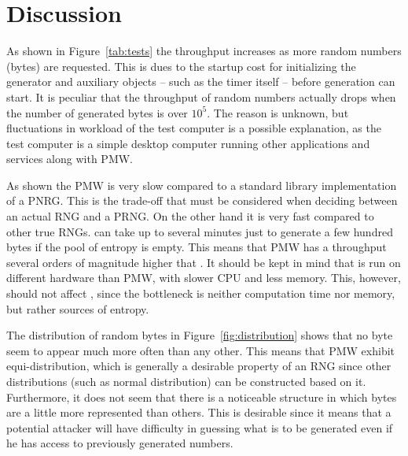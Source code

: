 \section{Discussion}
\label{sec:discussion}
As shown in Figure~\ref{tab:tests} the throughput increases as more random numbers (bytes) are requested.
This is dues to the startup cost for initializing the generator and auxiliary objects -- such as the timer itself -- before generation can start.
It is peculiar that the throughput of random numbers actually drops when the number of generated bytes is over $10^5$.
The reason is unknown, but fluctuations in workload of the test computer is a possible explanation, as the test computer is a simple desktop computer running other applications and services along with PMW.

As shown the PMW is very slow compared to a standard library implementation of a PNRG.
This is the trade-off that must be considered when deciding between an actual RNG and a PRNG.
On the other hand it is very fast compared to other true RNGs.
\devrandom{} can take up to several minutes just to generate a few hundred bytes if the pool of entropy is empty.
This means that PMW has a throughput several orders of magnitude higher that \devrandom{}.
It should be kept in mind that \devrandom{} is run on different hardware than PMW, with slower CPU and less memory.
This, however, should not affect \devrandom{}, since the bottleneck is neither computation time nor memory, but rather sources of entropy.

The distribution of random bytes in Figure~\ref{fig:distribution} shows that no byte seem to appear much more often than any other.
This means that PMW exhibit equi-distribution, which is generally a desirable property of an RNG since other distributions (such as normal distribution) can be constructed based on it.
Furthermore, it does not seem that there is a noticeable structure in which bytes are a little more represented than others.
This is desirable since it means that a potential attacker will have difficulty in guessing what is to be generated even if he has access to previously generated numbers.